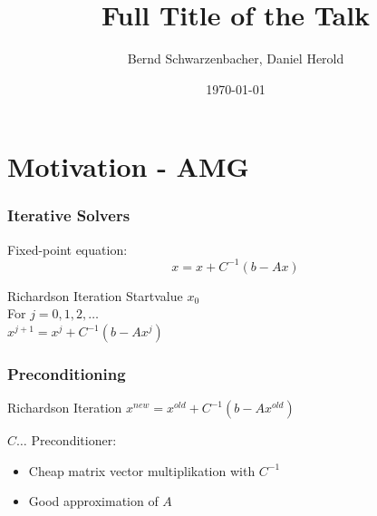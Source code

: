 \documentclass{beamer}
\title[Short title]{Full Title of the Talk} %
\author{Bernd Schwarzenbacher, Daniel Herold} %
\institute[TU Wien] %
{
Technical University of Vienna \\ %
\medskip
}
\date{\today} %
\begin{document}
\begin{frame}
\titlepage %
\end{frame}



\section{Motivation - AMG}

\begin{frame}
\frametitle{Iterative Solvers}
Fixed-point equation:
$$x = x + C^{-1} (b-Ax)$$
\begin{block}{Richardson Iteration}
Startvalue $x_{0}$ \\
For $j = 0, 1, 2, \dots$ \\
\quad $x^{j+1} = x^{j} + C^{-1} (b - Ax^{j})$
\end{block}
\end{frame}

\begin{frame}
\frametitle{Preconditioning}
\begin{block}{Richardson Iteration}
$x^{new} = x^{old} + C^{-1} (b - Ax^{old})$
\end{block}
$C \dots$ Preconditioner:
\begin{itemize}
  \item Cheap matrix vector multiplikation with $C^{-1}$
  \item Good approximation of $A$
\end{itemize}
\end{frame}
\end{document}
